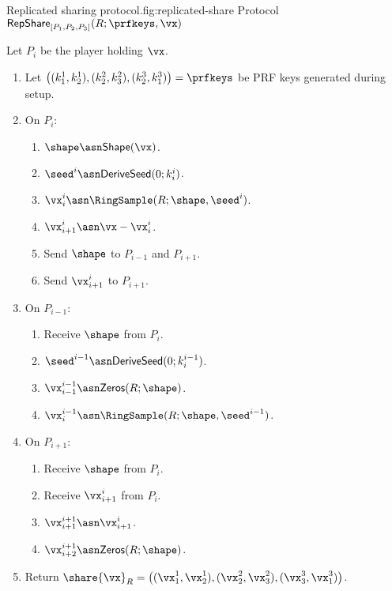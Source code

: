 
\begin{Boxfig}{Replicated sharing protocol.}{fig:replicated-share}
  {Protocol $\mathsf{RepShare}_{[P_1, P_2, P_3]}(R; \prfkeys, \vx)$}
  
  Let $P_i$ be the player holding $\vx$.
  
  \begin{enumerate}
  \item Let $\left( (k_1^1, k_2^1), (k_2^2, k_3^2), (k_2^3, k_1^3) \right) = \prfkeys$ be PRF keys generated during setup.
  
  \item On $P_i$:
  \begin{enumerate}
    \item $\shape \asn \mathsf{Shape}(\vx)$.
    \item ${\seed}^i \asn \mathsf{DeriveSeed}(0; k^i_i)$.
    \item $\vx_i^i \asn \RingSample(R; \shape, \seed^i)$.
    \item $\vx_{i+1}^i \asn \vx - \vx_i^i$.
    \item Send $\shape$ to $P_{i-1}$ and $P_{i+1}$.
    \item Send $\vx_{i+1}^i$ to $P_{i+1}$.
  \end{enumerate}
  
  \item On $P_{i-1}$:
  \begin{enumerate}
    \item Receive $\shape$ from $P_i$.
    \item ${\seed}^{i-1} \asn \mathsf{DeriveSeed}(0; k^{i-1}_i)$.
    \item $\vx_{i-1}^{i-1} \asn \mathsf{Zeros}(R; \shape)$.
    \item $\vx_i^{i-1} \asn \RingSample(R; \shape, \seed^{i-1})$.
  \end{enumerate}
  
  \item On $P_{i+1}$:
  \begin{enumerate}
    \item Receive $\shape$ from $P_i$.
    \item Receive $\vx_{i+1}^i$ from $P_i$.
    \item $\vx_{i+1}^{i+1} \asn \vx_{i+1}^i$.
    \item $\vx_{i+2}^{i+1} \asn \mathsf{Zeros}(R; \shape)$.
  \end{enumerate}
  
  \item Return $\share{\vx}_R = \left( (\vx_1^1, \vx_2^1), (\vx_2^2, \vx_3^2), (\vx_3^3, \vx_1^3) \right)$.
  \end{enumerate}
\end{Boxfig}


